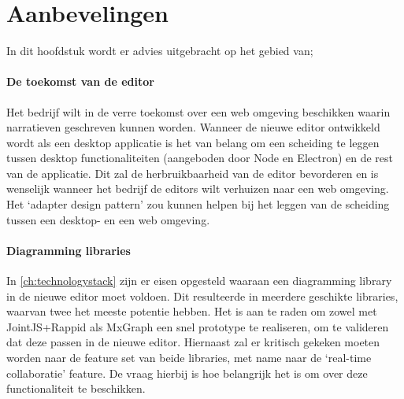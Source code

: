 \chapter{Aanbevelingen}
\label{ch:aanbevelingen}
In dit hoofdstuk wordt er advies uitgebracht op het gebied van;

\subsubsection{De toekomst van de editor}
Het bedrijf wilt in de verre toekomst over een web omgeving beschikken waarin narratieven geschreven kunnen worden. Wanneer de nieuwe editor ontwikkeld wordt als een desktop applicatie is het van belang om een scheiding te leggen tussen desktop functionaliteiten (aangeboden door Node en Electron) en de rest van de applicatie. Dit zal de herbruikbaarheid van de editor bevorderen en is wenselijk wanneer het bedrijf de editors wilt verhuizen naar een web omgeving. Het ‘adapter design pattern’ zou kunnen helpen bij het leggen van de scheiding tussen een desktop- en een web omgeving.

\subsubsection{Diagramming libraries}
In \autoref{ch:technologystack} zijn er eisen opgesteld waaraan een diagramming library in de nieuwe editor moet voldoen. Dit resulteerde in meerdere geschikte libraries, waarvan twee het meeste potentie hebben. Het is aan te raden om zowel met JointJS+Rappid als MxGraph een snel prototype te realiseren, om te valideren dat deze passen in de nieuwe editor. Hiernaast zal er kritisch gekeken moeten worden naar de feature set van beide libraries, met name naar de ‘real-time collaboratie’ feature. De vraag hierbij is hoe belangrijk het is om over deze functionaliteit te beschikken.
